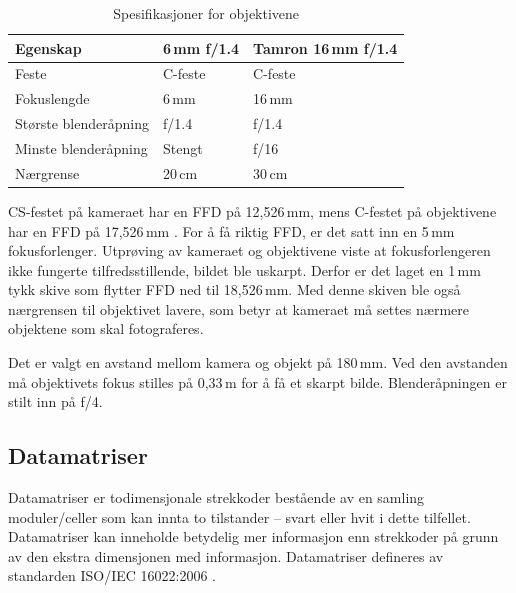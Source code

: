\documentclass[Visionprosjekt.tex]{subfiles}
\begin{document}
\begin{table}[ht]
    \centering
    \caption{Spesifikasjoner for objektivene}
    \label{tab:objektiver}
    \begin{tabularx}{0.70\textwidth}{llX}
        \toprule
         Egenskap               &	6\,mm f/1.4	&	 Tamron 16\,mm f/1.4\\
        \midrule
        Feste	                &	C-feste	    &	C-feste\\
        Fokuslengde	            &	6\,mm	    &	16\,mm\\
        Største blenderåpning	&	f/1.4	    &	f/1.4\\
        Minste blenderåpning	&	Stengt	    &	f/16\\
        Nærgrense	            &	20\,cm	    &	30\,cm\\
        \bottomrule
    \end{tabularx}
\end{table}


CS-festet på kameraet har en FFD på 12,526\,mm, mens C-festet på objektivene har en FFD på 17,526\,mm \cite{CSmount}. For å få riktig FFD, er det satt inn en 5\,mm fokusforlenger. Utprøving av kameraet og objektivene viste at fokusforlengeren ikke fungerte tilfredsstillende, bildet ble uskarpt. Derfor er det laget en 1\,mm tykk skive som flytter FFD ned til 18,526\,mm.
Med denne skiven ble også nærgrensen  til objektivet  lavere, som betyr at kameraet må settes nærmere objektene som skal fotograferes.


Det er valgt en avstand mellom kamera og objekt på 180\,mm. Ved den avstanden må objektivets fokus stilles på  0,33\,m for å få et skarpt bilde. Blenderåpningen er stilt inn på f/4.





\subsection{Datamatriser}

Datamatriser er todimensjonale strekkoder bestående av en samling moduler/celler som kan innta to tilstander -- svart eller hvit i dette tilfellet. Datamatriser kan inneholde betydelig mer informasjon enn strekkoder på grunn av den ekstra dimensjonen med informasjon.
Datamatriser defineres av standarden ISO/IEC 16022:2006  \cite{iso16022}.
\end{document}
